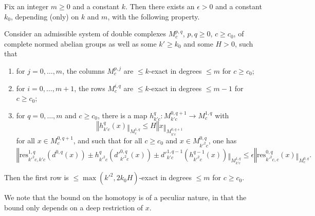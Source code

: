 \begin{proposition}
  \label{spectral}
  Fix an integer $m\geq 0$ and a constant $k$.
  Then there exists an $\epsilon>0$ and a constant $k_0$,
  depending (only) on $k$ and $m$, with the following property.

  Consider an admissible system of double complexes $M^{p,q}_c$, $p,q\geq 0$, $c\geq c_0$,
  of complete normed abelian groups as well as some $k'\geq k_0$ and some $H>0$, such that
  \begin{center}
  \end{center}
  \begin{enumerate}
  \item for $j=0,\ldots,m$, the columns $M^{p,j}_c$ are $\leq k$-exact in degrees $\leq m$ for $c\geq c_0$;
  \item for $i=0,\ldots,m+1$, the rows $M^{i,q}_c$ are $\leq k$-exact in degrees $\leq m-1$ for $c\geq c_0$;
  \item for $q=0,\ldots,m$ and $c\geq c_0$, there is a map $h^q_{k'c}: M^{0,q+1}_{k'c}\to M^{1,q}_c$ with
  \[
  ‖h^q_{k'c}(x)‖_{M^{1,q}_c}\leq H‖x‖_{M^{0,q+1}_{k'c}}
  \]
  for all $x\in M^{0,q+1}_c$, and such that for all $c\geq c_0$ and $x\in M^{0,q}_{k'^2c}$, one has
  \begin{equation}\label{eq:homotopicmapsmall}
  ‖\mathrm{res}_{k'^2c,k'c}^{1,q}(d^{0,q}(x))\pm h^q_{k'^2c}(d'^{0,q}_{k'^2c}(x))\pm d'^{1,q-1}_{k'c}(h^{q-1}_{k'^2c}(x))‖_{M^{1,q}_{k'c}}\leq \epsilon ‖\mathrm{res}_{k'^2c,c}^{0,q}(x)‖_{M^{0,q}_c}.
  \end{equation}
  \end{enumerate}
  Then the first row is $\leq \max(k'^2,2k_0H)$-exact in degrees $\leq m$ for $c\geq c_0$.
\end{proposition}

We note that the bound on the homotopy is of a peculiar nature, in that the bound only depends on a deep restriction of $x$.


